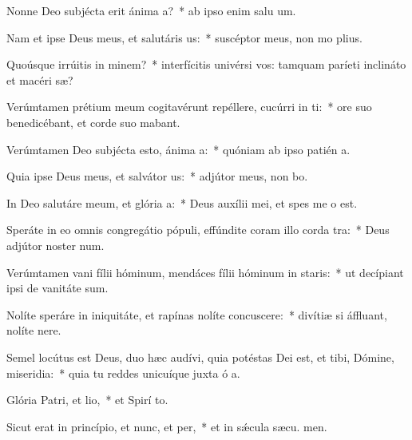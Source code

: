 \item Nonne Deo subjécta erit ánima a?~* ab ipso enim salu um.
\item Nam et ipse Deus meus, et salutáris us:~* suscéptor meus, non mo plius.
\item Quoúsque irrúitis in minem?~* interfícitis univérsi vos: tamquam paríeti inclináto et macéri sæ?
\item Verúmtamen prétium meum cogitavérunt repéllere, cucúrri in ti:~* ore suo benedicébant, et corde suo mabant.
\item Verúmtamen Deo subjécta esto, ánima a:~* quóniam ab ipso patién a.
\item Quia ipse Deus meus, et salvátor us:~* adjútor meus, non bo.
\item In Deo salutáre meum, et glória a:~* Deus auxílii mei, et spes me  o est.
\item Speráte in eo omnis congregátio pópuli, effúndite coram illo corda tra:~* Deus adjútor noster  num.
\item Verúmtamen vani fílii hóminum, mendáces fílii hóminum in staris:~* ut decípiant ipsi de vanitáte  sum.
\item Nolíte speráre in iniquitáte, et rapínas nolíte concuscere:~* divítiæ si áffluant, nolíte  nere.
\item Semel locútus est Deus, duo hæc audívi, quia potéstas Dei est, et tibi, Dómine, miseridia:~* quia tu reddes unicuíque juxta ó a.
\item Glória Patri, et lio,~* et Spirí to.
\item Sicut erat in princípio, et nunc, et per,~* et in sǽcula sæcu. men.
